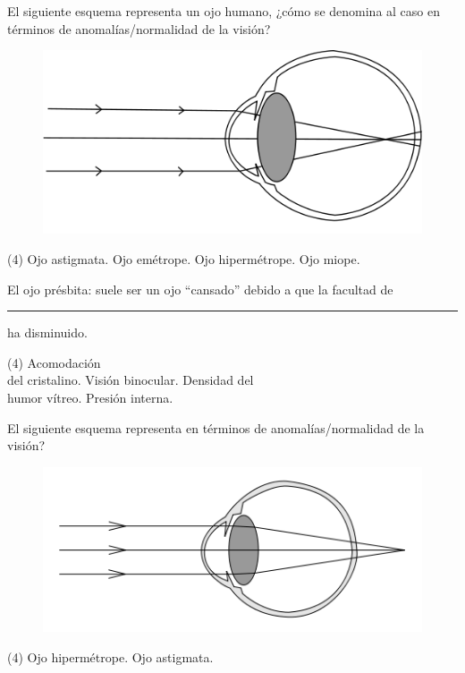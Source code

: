 \documentclass[12pt, letter]{exam}
\begin{document}
\begin{questions}
    \question El siguiente esquema representa un ojo humano, ¿cómo se denomina al caso en términos de anomalías/normalidad de la visión?
    \begin{figure}[H]
        \centering
        \includegraphics[scale=0.3]{Imagenes/Defectos_Vision_03.png}
    \end{figure}
    \begin{tasks}(4)
        \task Ojo astigmata.
        \task Ojo emétrope.
        \task Ojo hipermétrope.
        \task Ojo miope.
    \end{tasks}
    \question El ojo présbita: suele ser un ojo \enquote{cansado} debido a que la facultad de \rule{2cm}{0.1mm} ha disminuido.
    \begin{tasks}(4)
        \task Acomodación \\ del cristalino.
        \task Visión binocular.
        \task Densidad del \\ humor vítreo.
        \task Presión interna.
    \end{tasks}
    \question El siguiente esquema representa en términos de anomalías/normalidad de la visión?
    \begin{figure}[H]
        \centering
        \includegraphics[scale=0.4]{Imagenes/Defectos_Vision_05.png}
    \end{figure}
    \begin{tasks}(4)
        \task Ojo hipermétrope.
        \task Ojo astigmata.

\end{tasks}
\end{questions}
\end{document}
